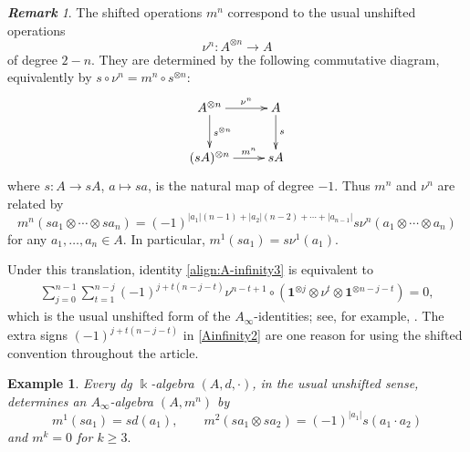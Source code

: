 \documentclass[a4paper, 11pt]{amsart}
\newtheorem{exm}[thm]{Example}
\theoremstyle{definition}
\theoremstyle{remark}
\newtheorem{rem}[thm]{\bf Remark}
\numberwithin{equation}{section}
\begin{document}
\begin{rem}
The shifted operations $m^n$ correspond to the usual unshifted operations
\[
\nu^n \colon A^{\otimes n} \to A
\]
of degree $2-n$. They are determined by the following commutative diagram, equivalently by $s\circ \nu^n=m^n\circ s^{\otimes n}$:
\begin{align}\label{align:mnbn}
\xymatrix{
A^{\otimes n} \ar[r]^-{\nu^n} \ar[d]^-{s^{\otimes n}} & A \ar[d]^-{s}\\
(sA)^{\otimes n} \ar[r]^-{m^n} & sA
}
\end{align}
where $s\colon A\to sA$, $a\mapsto sa$, is the natural map of degree $-1$. Thus $m^n$ and $\nu^n$ are related by
\[
m^n(sa_1 \otimes \dotsb \otimes sa_n) = (-1)^{|a_1|(n-1) + |a_2|(n-2) + \dotsb + |a_{n-1}|} s \nu^n (a_1\otimes \dotsb \otimes a_n)
\]
for any $a_1,\dotsc, a_n \in A$. In particular, $m^1(sa_1) = s\nu^1(a_1)$.


Under this translation, identity \eqref{align:A-infinity3} is equivalent to
\begin{align}
\label{Ainfinity2}
\sum_{j=0}^{n-1}\sum_{t=1}^{n-j} (-1)^{j+t(n-j-t)} \nu^{n-t+1}\circ (\mathbf 1 ^{\otimes j} \otimes \nu^t \otimes \mathbf 1 ^{\otimes n-j-t}) = 0,
\end{align}
which is the usual unshifted form of the $A_\infty$-identities; see, for example, \cite[Section 3]{Kel01}. The extra signs $(-1)^{j+t(n-j-t)}$ in \eqref{Ainfinity2} are one reason for using the shifted convention throughout the article.
\end{rem}

\begin{exm}\label{exm:shiftedandunshifted}
Every dg $\Bbbk$-algebra $(A,d,\cdot)$, in the usual unshifted sense, determines an $A_\infty$-algebra $(A,m^n)$ by
 $$ m^1(sa_1)= s d(a_1), \qquad m^2(sa_1 \otimes sa_2)= (-1)^{|a_1|} s (a_1\cdot a_2)$$
 and $m^k =0$ for $k \geq 3.$
\end{exm}
\end{document}
